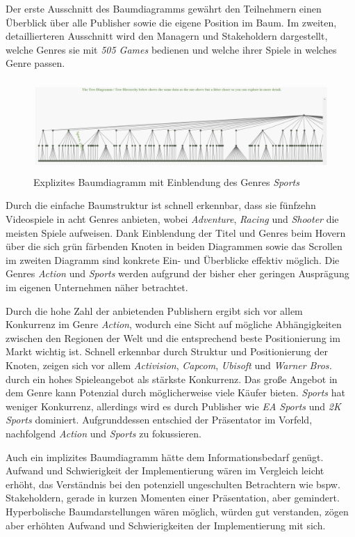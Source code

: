 \documentclass[usegeometry=true]{scrartcl}
\begin{document}
Der erste Ausschnitt des Baumdiagramms gewährt den Teilnehmern einen Überblick über alle Publisher sowie die eigene Position im Baum.
Im zweiten, detaillierteren Ausschnitt wird den Managern und Stakeholdern dargestellt, welche Genres sie mit \textit{505 Games} bedienen und welche ihrer Spiele in welches Genre passen.
\begin{figure}[h]
        \centering
        \includegraphics[height=3.5cm]{Bilder/TreeHierarchy_505Sports.png}
        \caption{Explizites Baumdiagramm mit Einblendung des Genres \textit{Sports}}
        \label{fig:TreeHierarchySports}
\end{figure}
Durch die einfache Baumstruktur ist schnell erkennbar, dass sie fünfzehn Videospiele in acht Genres anbieten, wobei \textit{Adventure}, \textit{Racing} und \textit{Shooter} die meisten Spiele aufweisen.
Dank Einblendung der Titel und Genres beim Hovern über die sich grün färbenden Knoten in beiden Diagrammen sowie das Scrollen im zweiten Diagramm sind konkrete Ein- und Überblicke effektiv möglich. 
Die Genres \textit{Action} und \textit{Sports} werden aufgrund der bisher eher geringen Ausprägung im eigenen Unternehmen näher betrachtet. 

Durch die hohe Zahl der anbietenden Publishern ergibt sich vor allem Konkurrenz im Genre \textit{Action}, wodurch eine Sicht auf mögliche Abhängigkeiten zwischen den Regionen der Welt und die entsprechend beste Positionierung im Markt wichtig ist.
Schnell erkennbar durch Struktur und Positionierung der Knoten, zeigen sich vor allem \textit{Activision}, \textit{Capcom}, \textit{Ubisoft} und \textit{Warner Bros.} durch ein hohes Spieleangebot als stärkste Konkurrenz. 
Das große Angebot in dem Genre kann Potenzial durch möglicherweise viele Käufer bieten.
\textit{Sports} hat weniger Konkurrenz, allerdings wird es durch Publisher wie \textit{EA Sports} und \textit{2K Sports} dominiert.
Aufgrunddessen entschied der Präsentator im Vorfeld, nachfolgend \textit{Action} und \textit{Sports} zu fokussieren.

Auch ein implizites Baumdiagramm hätte dem Informationsbedarf genügt. 
Aufwand und Schwierigkeit der Implementierung wären im Vergleich leicht erhöht, das Verständnis bei den potenziell ungeschulten Betrachtern wie bspw. Stakeholdern, gerade in kurzen Momenten einer Präsentation, aber gemindert. 
Hyperbolische Baumdarstellungen wären möglich, würden gut verstanden, zögen aber erhöhten Aufwand und Schwierigkeiten der Implementierung mit sich. 
\end{document}
